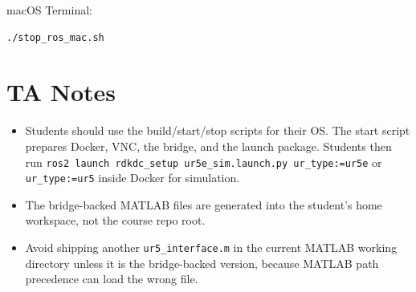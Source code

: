 \documentclass[11pt]{article}
\begin{document}
macOS Terminal:

\begin{Verbatim}
./stop_ros_mac.sh
\end{Verbatim}

\section*{TA Notes}

\begin{itemize}
    \item Students should use the build/start/stop scripts for their OS. The start script prepares Docker, VNC, the bridge, and the launch package. Students then run \texttt{ros2 launch rdkdc\_setup ur5e\_sim.launch.py ur\_type:=ur5e} or \texttt{ur\_type:=ur5} inside Docker for simulation.
    \item The bridge-backed MATLAB files are generated into the student's home workspace, not the course repo root.
    \item Avoid shipping another \texttt{ur5\_interface.m} in the current MATLAB working directory unless it is the bridge-backed version, because MATLAB path precedence can load the wrong file.
\end{itemize}
\end{document}
